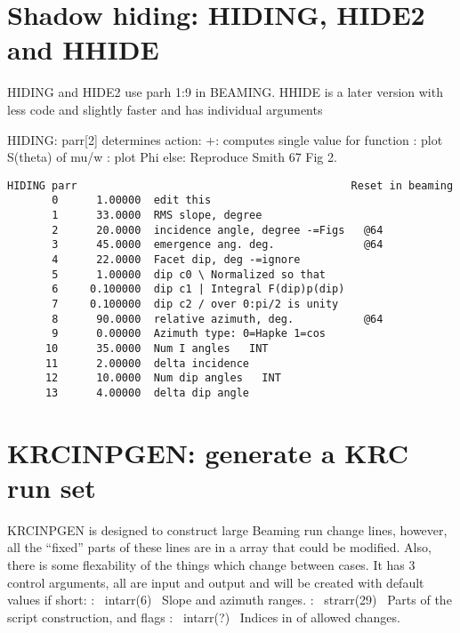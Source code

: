 \documentclass{article}
\begin{document}

\appendix %

\section{Shadow hiding: HIDING, HIDE2 and HHIDE}

HIDING and HIDE2 use parh 1:9 in BEAMING.  HHIDE is a later version with less code and slightly faster and has individual arguments

HIDING: parr[2] determines action:
 +: computes single value for function
: plot S(theta) of mu/w
:  plot Phi
\qi else: Reproduce Smith 67 Fig 2. 

\vspace{-3.mm} 
\begin{verbatim}
HIDING parr                                           Reset in beaming
       0      1.00000  edit this
       1      33.0000  RMS slope, degree
       2      20.0000  incidence angle, degree -=Figs   @64
       3      45.0000  emergence ang. deg.              @64
       4      22.0000  Facet dip, deg -=ignore
       5      1.00000  dip c0 \ Normalized so that
       6     0.100000  dip c1 | Integral F(dip)p(dip)
       7     0.100000  dip c2 / over 0:pi/2 is unity
       8      90.0000  relative azimuth, deg.           @64
       9      0.00000  Azimuth type: 0=Hapke 1=cos
      10      35.0000  Num I angles   INT
      11      2.00000  delta incidence
      12      10.0000  Num dip angles   INT
      13      4.00000  delta dip angle

\end{verbatim} 


\section{KRCINPGEN: generate a KRC run set}
KRCINPGEN is designed to construct large Beaming run change lines, however, all
the ``fixed'' parts of these lines are in a array that could be modified. Also,
there is some flexability of the things which change between cases. It has 3
control arguments, all are input and output and will be created with default
values if short:
:  \ intarr(6) \ Slope and azimuth ranges. 
:  \  strarr(29) \ Parts of the script construction, and flags
:  \    intarr(?) \  Indices in  of allowed changes.
\end{document}

